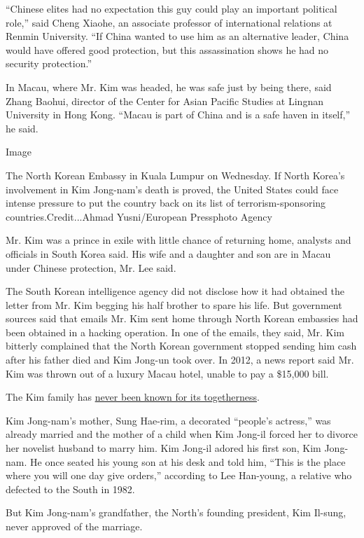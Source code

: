 ``Chinese elites had no expectation this guy could play an important
political role,'' said Cheng Xiaohe, an associate professor of
international relations at Renmin University. ``If China wanted to use
him as an alternative leader, China would have offered good protection,
but this assassination shows he had no security protection.''

In Macau, where Mr. Kim was headed, he was safe just by being there,
said Zhang Baohui, director of the Center for Asian Pacific Studies at
Lingnan University in Hong Kong. ``Macau is part of China and is a safe
haven in itself,'' he said.

Image

The North Korean Embassy in Kuala Lumpur on Wednesday. If North Korea's
involvement in Kim Jong-nam's death is proved, the United States could
face intense pressure to put the country back on its list of
terrorism-sponsoring countries.Credit...Ahmad Yusni/European Pressphoto
Agency

Mr. Kim was a prince in exile with little chance of returning home,
analysts and officials in South Korea said. His wife and a daughter and
son are in Macau under Chinese protection, Mr. Lee said.

The South Korean intelligence agency did not disclose how it had
obtained the letter from Mr. Kim begging his half brother to spare his
life. But government sources said that emails Mr. Kim sent home through
North Korean embassies had been obtained in a hacking operation. In one
of the emails, they said, Mr. Kim bitterly complained that the North
Korean government stopped sending him cash after his father died and Kim
Jong-un took over. In 2012, a news report said Mr. Kim was thrown out of
a luxury Macau hotel, unable to pay a \$15,000 bill.

The Kim family has
\href{http://www.nytimes3xbfgragh.onion/2011/12/23/world/asia/family-intrigue-shadows-north-koreas-secretive-dynasty.html}{never
been known for its togetherness}.

Kim Jong-nam's mother, Sung Hae-rim, a decorated ``people's actress,''
was already married and the mother of a child when Kim Jong-il forced
her to divorce her novelist husband to marry him. Kim Jong-il adored his
first son, Kim Jong-nam. He once seated his young son at his desk and
told him, ``This is the place where you will one day give orders,''
according to Lee Han-young, a relative who defected to the South in
1982.

But Kim Jong-nam's grandfather, the North's founding president, Kim
Il-sung, never approved of the marriage.

